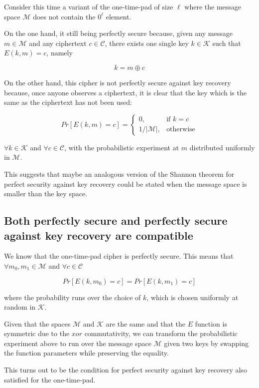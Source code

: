 \documentclass{article}
\begin{document}
Consider this time a variant of the one-time-pad of size 
$\ell$ where the message space $\mathcal{M}$ does not contain 
the $0^\ell$ element.

On the one hand, it still being perfectly secure because, given 
any message $m \in \mathcal{M}$ and any ciphertext 
$c \in \mathcal{C}$, there exists one single key 
$k \in \mathcal{K}$ such that $E(k, m) = c$, namely

$$k = m \oplus c$$

On the other hand, this cipher is not perfectly secure against 
key recovery because, once anyone observes a ciphertext, 
it is clear that the key which is the same as the ciphertext 
has not been used:

$$
  Pr[E(k, m) = c] = 
  \begin{cases}
    0, & \text{if } k = c \\
    1 / \left|\mathcal{M}\right|, & \text{otherwise}
  \end{cases} 
$$

$\forall k \in \mathcal{K}$ and $\forall c \in \mathcal{C}$, with
the probabilistic experiment at $m$ distributed uniformly in 
$\mathcal{M}$.

This suggests that maybe an analogous version of 
the Shannon theorem for perfect security against key recovery 
could be stated when the message space is smaller than the 
key space.

\subsection{Both perfectly secure and perfectly secure against key recovery are
compatible}

We know that the one-time-pad cipher is perfectly secure. 
This means that $\forall m_0, m_1 \in \mathcal{M}$ and 
$\forall c \in \mathcal{C}$

$$ Pr[E(k, m_0) = c] = Pr[E(k, m_1) = c] $$

where the probability runs over the choice of $k$, which is chosen 
uniformly at random in $\mathcal{K}$.

Given that the spaces $\mathcal{M}$ and $\mathcal{K}$ are the same
and that the $E$ function is symmetric due to the $xor$ 
commutativity, we can transform the probabilistic experiment 
above to run over the message space $\mathcal{M}$ given two keys 
by swapping the function parameters while preserving the equality. 

This turns out to be the condition for perfect security against 
key recovery also satisfied for the one-time-pad.
\end{document}
